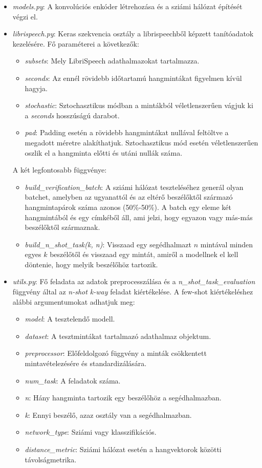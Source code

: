 \begin{itemize}
	\item \emph{models.py}: A konvolúciós enkóder létrehozása és a sziámi hálózat építését végzi el.
	\item \emph{librispeech.py}: Keras szekvencia osztály a librispeechből képzett tanítóadatok kezelésére. Fő paraméterei a következők:
	\begin{itemize}
		\item \emph{subsets}: Mely LibriSpeech adathalmazokat tartalmazza.
		\item \emph{seconds}: Az ennél rövidebb időtartamú hangmintákat figyelmen kívül hagyja.
		\item \emph{stochastic}: Sztochasztikus módban a mintákból véletlenszerűen vágjuk ki a \emph{seconds} hosszúságú darabot.
		\item \emph{pad}: Padding esetén a rövidebb hangmintákat nullával feltöltve a megadott méretre alakíthatjuk. Sztochasztikus mód esetén véletlenszerűen oszlik el a hangminta előtti és utáni nullák száma.
	\end{itemize}

	A két legfontosabb függvénye:
	
	\begin{itemize}
		\item \emph{build\_verification\_batch}: A sziámi hálózat teszteléséhez generál olyan batchet, amelyben az ugyanattól és az eltérő beszélőktől származó hangmintapárok száma azonos (50\%-50\%). A batch egy eleme két hangmintából és egy címkéből áll, ami jelzi, hogy egyazon vagy más-más beszélőktől származnak.
		\item \emph{build\_n\_shot\_task(k, n)}: Visszaad egy segédhalmazt $n$ mintával minden egyes $k$ beszélőtől és visszaad egy mintát, amiről a modellnek el kell döntenie, hogy melyik beszélőhöz tartozik.
	\end{itemize}
	\item \emph{utils.py}: Fő feladata az adatok preprocesszálása és a \emph{n\_shot\_task\_evaluation} függvény által az \emph{n-shot k-way} feladat kiértékelése. A few-shot kiértékeléshez alábbi argumentumokat adhatjuk meg:
	
	\begin{itemize}
		\item  \emph{model}: A tesztelendő modell.
		\item  \emph{dataset}: A tesztmintákat tartalmazó adathalmaz objektum.
		\item  \emph{preprocessor}: Előfeldolgozó függvény a minták csökkentett mintavételezésére és standardizálására.
		\item  \emph{num\_task}: A feladatok száma.
		\item  \emph{n}: Hány hangminta tartozik egy beszélőhöz a segédhalmazban.
		\item  \emph{k}: Ennyi beszélő, azaz osztály van a segédhalmazban.
		\item  \emph{network\_type}: Sziámi vagy klasszifikációs.
		\item  \emph{distance\_metric}: Sziámi hálózat esetén a hangvektorok közötti távolságmetrika.
	\end{itemize}
\end{itemize}

